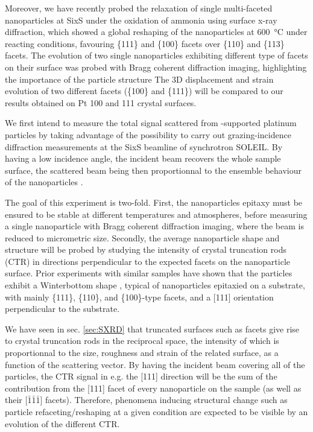 Moreover, we have recently probed the relaxation of single multi-faceted nanoparticles at SixS under the oxidation of ammonia using surface x-ray diffraction, which showed a global reshaping of the nanoparticles at \qty{600}{\degreeCelsius} under reacting conditions, favouring \{111\} and \{100\} facets over \{110\} and \{113\} facets.
The evolution of two single nanoparticles exhibiting different type of facets on their surface was probed with Bragg coherent diffraction imaging, highlighting the importance of the particle structure
The 3D displacement and strain evolution of two different facets (\{100\} and \{111\}) will be compared to our results obtained on Pt 100 and 111 crystal surfaces.

We first intend to measure the total signal scattered from -supported platinum particles by taking advantage of the possibility to carry out grazing-incidence diffraction measurements at the SixS beamline of synchrotron SOLEIL.
By having a low incidence angle, the incident beam recovers the whole sample surface, the scattered beam being then proportionnal to the ensemble behaviour of the nanoparticles \parencite{Nolte2008, Hejral2013}.

The goal of this experiment is two-fold.
First, the nanoparticles epitaxy must be ensured to be stable at different temperatures and atmospheres, before measuring a single nanoparticle with Bragg coherent diffraction imaging, where the beam is reduced to micrometric size.
Secondly, the average nanoparticle shape and structure will be probed by studying the intensity of crystal truncation rods (CTR) in directions perpendicular to the expected facets on the nanoparticle surface.
Prior experiments with similar samples \parencite{Dupraz2017, Li2020, Lim2021, Dupraz2022} have shown that the particles exhibit a Winterbottom shape \parencite{WINTERBOTTOM1967, Boukouvala2021}, typical of nanoparticles epitaxied on a substrate, with mainly \{111\}, \{110\}, and \{100\}-type facets, and a [111] orientation perpendicular to the substrate.

We have seen in sec. \ref{sec:SXRD} that truncated surfaces such as facets give rise to crystal truncation rods in the reciprocal space, the intensity of which is proportionnal to the size, roughness and strain of the related surface, as a function of the scattering vector.
By having the incident beam covering all of the particles, the CTR signal in e.g. the [111] direction will be the sum of the contribution from the [111] facet of every nanoparticle on the sample (as well as their [$\bar{1}\bar{1}\bar{1}$] facets).
Therefore, phenomena inducing structural change such as particle refaceting/reshaping at a given condition are expected to be visible by an evolution of the different CTR.

